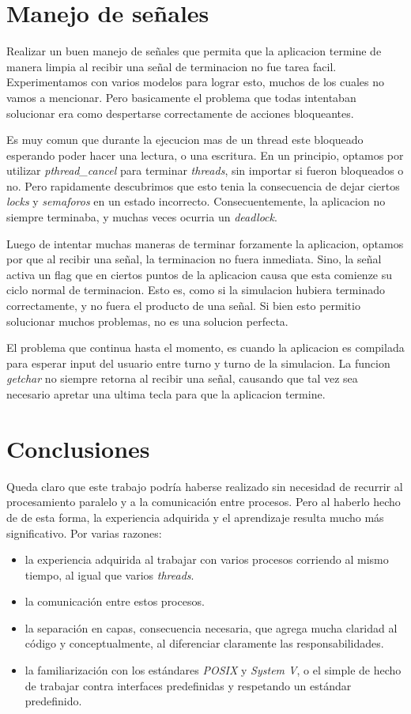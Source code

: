 \documentclass[a4paper,10pt]{article}
\begin{document}
\newpage
\section{Manejo de señales}
Realizar un buen manejo de señales que permita que la aplicacion termine de manera limpia al recibir una señal de terminacion no fue tarea facil.
Experimentamos con varios modelos para lograr esto, muchos de los cuales no vamos a mencionar.
Pero basicamente el problema que todas intentaban solucionar era como despertarse correctamente de acciones bloqueantes.

Es muy comun que durante la ejecucion mas de un thread este bloqueado esperando poder hacer una lectura, o una escritura.
En un principio, optamos por utilizar \textit{pthread_cancel} para terminar \textit{threads}, sin importar si fueron bloqueados o no.
Pero rapidamente descubrimos que esto tenia la consecuencia de dejar ciertos \textit{locks} y \textit{semaforos} en un estado incorrecto.
Consecuentemente, la aplicacion no siempre terminaba, y muchas veces ocurria un \textit{deadlock}.

Luego de intentar muchas maneras de terminar forzamente la aplicacion, optamos por que al recibir una señal, la terminacion no fuera inmediata.
Sino, la señal activa un flag que en ciertos puntos de la aplicacion causa que esta comienze su ciclo normal de terminacion.
Esto es, como si la simulacion hubiera terminado correctamente, y no fuera el producto de una señal.
Si bien esto permitio solucionar muchos problemas, no es una solucion perfecta.

El problema que continua hasta el momento, es cuando la aplicacion es compilada para esperar input del usuario entre turno y turno de la simulacion. 
La funcion \textit{getchar} no siempre retorna al recibir una señal, causando que tal vez sea necesario apretar una ultima tecla para que la aplicacion termine.


\newpage
\section{Conclusiones}

Queda claro que este trabajo podría haberse realizado sin necesidad de recurrir al procesamiento paralelo y a la comunicación entre procesos. Pero al haberlo 
hecho de de esta forma, la experiencia adquirida y el aprendizaje resulta mucho más significativo. Por varias razones:

\begin{itemize}
\item la experiencia adquirida al trabajar con varios procesos corriendo al mismo tiempo, al igual que varios \textit{threads}.
\item la comunicación entre estos procesos.
\item la separación en capas, consecuencia necesaria, que agrega mucha claridad al código y conceptualmente, al diferenciar claramente las responsabilidades.
\item la familiarización con los estándares \textit{POSIX} y \textit{System V}, o el simple de hecho de trabajar contra interfaces predefinidas y respetando
      un estándar predefinido.
\end{itemize}
\end{document}
